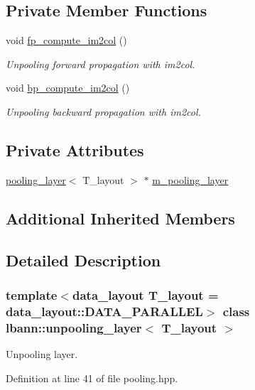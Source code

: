 \subsection*{Private Member Functions}
\begin{DoxyCompactItemize}
\item 
void \hyperlink{classlbann_1_1unpooling__layer_ab4a0b7cc4711426434983c41cd7dbc63}{fp\+\_\+compute\+\_\+im2col} ()
\begin{DoxyCompactList}\small\item\em Unpooling forward propagation with im2col. \end{DoxyCompactList}\item 
void \hyperlink{classlbann_1_1unpooling__layer_ad4607102ff59de2f233a87f13967cc04}{bp\+\_\+compute\+\_\+im2col} ()
\begin{DoxyCompactList}\small\item\em Unpooling backward propagation with im2col. \end{DoxyCompactList}\end{DoxyCompactItemize}
\subsection*{Private Attributes}
\begin{DoxyCompactItemize}
\item 
\hyperlink{classlbann_1_1pooling__layer}{pooling\+\_\+layer}$<$ T\+\_\+layout $>$ $\ast$ \hyperlink{classlbann_1_1unpooling__layer_ab15a8b0680685f80c7d995e617e97a9a}{m\+\_\+pooling\+\_\+layer}
\end{DoxyCompactItemize}
\subsection*{Additional Inherited Members}


\subsection{Detailed Description}
\subsubsection*{template$<$data\+\_\+layout T\+\_\+layout = data\+\_\+layout\+::\+D\+A\+T\+A\+\_\+\+P\+A\+R\+A\+L\+L\+EL$>$\newline
class lbann\+::unpooling\+\_\+layer$<$ T\+\_\+layout $>$}

Unpooling layer. 

Definition at line 41 of file pooling.\+hpp.



